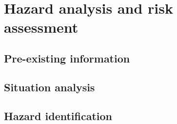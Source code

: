 \section{Hazard analysis and risk assessment}
%
%
% 

\subsection{Pre-existing information}
%

\subsection{Situation analysis}
%
%

\subsection{Hazard identification}
%

